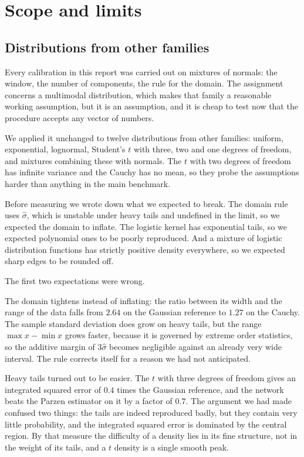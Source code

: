 \documentclass[11pt]{article}
\newcommand{\shat}{\hat{\sigma}}
\begin{document}
\section{Scope and limits}
\label{sec:limits}

\subsection{Distributions from other families}

Every calibration in this report was carried out on mixtures of normals: the window, the
number of components, the rule for the domain. The assignment concerns a multimodal
distribution, which makes that family a reasonable working assumption, but it is an
assumption, and it is cheap to test now that the procedure accepts any vector of numbers.

We applied it unchanged to twelve distributions from other families: uniform, exponential,
lognormal, Student's $t$ with three, two and one degrees of freedom, and mixtures combining
these with normals. The $t$ with two degrees of freedom has infinite variance and the Cauchy
has no mean, so they probe the assumptions harder than anything in the main benchmark.

Before measuring we wrote down what we expected to break. The domain rule uses $\shat$, which
is unstable under heavy tails and undefined in the limit, so we expected the domain to
inflate. The logistic kernel has exponential tails, so we expected polynomial ones to be
poorly reproduced. And a mixture of logistic distribution functions has strictly positive
density everywhere, so we expected sharp edges to be rounded off.

The first two expectations were wrong.

The domain tightens instead of inflating: the ratio between its width and the range of the
data falls from $2.64$ on the Gaussian reference to $1.27$ on the Cauchy. The
sample standard deviation does grow on heavy tails, but the range $\max x - \min x$ grows
faster, because it is governed by extreme order statistics, so the additive margin of
$3\shat$ becomes negligible against an already very wide interval. The rule corrects itself
for a reason we had not anticipated.

Heavy tails turned out to be easier. The $t$ with three degrees of freedom gives an
integrated squared error of $0.4$ times the Gaussian reference, and the network beats the
Parzen estimator on it by a factor of $0.7$. The argument we had made confused two things: the
tails are indeed reproduced badly, but they contain very little probability, and the
integrated squared error is dominated by the central region. By that measure the difficulty of
a density lies in its fine structure, not in the weight of its tails, and a $t$ density is a
single smooth peak.
\end{document}
